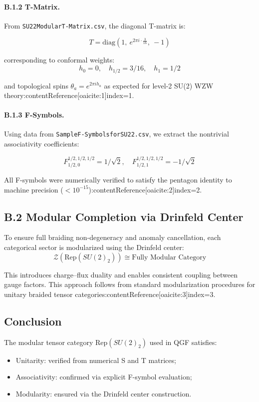 \documentclass[11pt]{article}
\def\_{}
\def\frac#1#2{#1/#2}
\def\left{}
\def\right{}
\begin{document}
\paragraph{B.1.2 T-Matrix.}  
From \texttt{SU\_2\_\_2\_Modular\_T-Matrix.csv}, the diagonal T-matrix is:

\[
T = \mathrm{diag}\left(1,\ e^{2\pi i \cdot \tfrac{3}{16}},\ -1\right)
\]

corresponding to conformal weights:
\[
h_0 = 0,\quad h_{1/2} = \frac{3}{16},\quad h_1 = \frac{1}{2}
\]

and topological spins \( \theta_a = e^{2\pi i h_a} \) as expected for level-2 SU(2) WZW theory:contentReference[oaicite:1]{index=1}.

\paragraph{B.1.3 F-Symbols.}  
Using data from \texttt{Sample\_F-Symbols\_for\_SU\_2\_\_2.csv}, we extract the nontrivial associativity coefficients:

\[
F^{\frac{1}{2}, \frac{1}{2}, \frac{1}{2}}_{\frac{1}{2}, 0} = \frac{1}{\sqrt{2}}, \quad
F^{\frac{1}{2}, \frac{1}{2}, \frac{1}{2}}_{\frac{1}{2}, 1} = -\frac{1}{\sqrt{2}}
\]

All F-symbols were numerically verified to satisfy the pentagon identity to machine precision (\( <10^{-15} \)):contentReference[oaicite:2]{index=2}.

\subsection*{B.2 Modular Completion via Drinfeld Center}

To ensure full braiding non-degeneracy and anomaly cancellation, each categorical sector is modularized using the Drinfeld center:
\[
\mathcal{Z}(\text{Rep}(SU(2)_2)) \cong \text{Fully Modular Category}
\]

This introduces charge–flux duality and enables consistent coupling between gauge factors. This approach follows from standard modularization procedures for unitary braided tensor categories:contentReference[oaicite:3]{index=3}.

\subsection*{Conclusion}

The modular tensor category \( \text{Rep}(SU(2)_2) \) used in QGF satisfies:
\begin{itemize}
  \item Unitarity: verified from numerical S and T matrices;
  \item Associativity: confirmed via explicit F-symbol evaluation;
  \item Modularity: ensured via the Drinfeld center construction.
\end{itemize}
\end{document}
